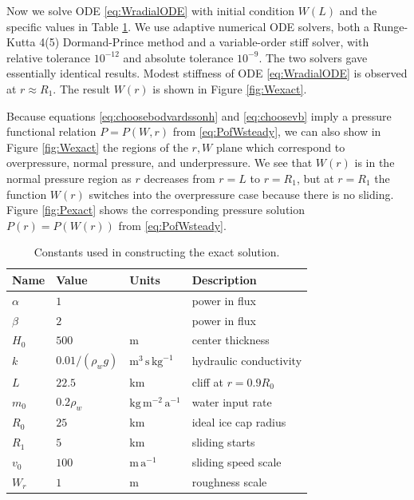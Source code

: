 \documentclass[gmd]{copernicus}   %
\newcommand{\text}{\textrm}
\begin{document}
Now we solve ODE \eqref{eq:WradialODE} with initial condition $W(L)$ and the specific values in Table \ref{tab:verifconstants}.  We use adaptive numerical ODE solvers, both a Runge-Kutta 4(5) Dormand-Prince method and a variable-order stiff solver, with relative tolerance $10^{-12}$ and absolute tolerance $10^{-9}$.  The two solvers gave essentially identical results.  Modest stiffness \citep{AscherPetzold} of ODE \eqref{eq:WradialODE} is observed at $r\approx R_1$.  The result $W(r)$ is shown in Figure \ref{fig:Wexact}.

Because equations \eqref{eq:choosebodvardssonh} and \eqref{eq:choosevb} imply a pressure functional relation $P=P(W,r)$ from \eqref{eq:PofWsteady}, we can also show in Figure \ref{fig:Wexact} the regions of the $r,W$ plane which correspond to overpressure, normal pressure, and underpressure.  We see that $W(r)$ is in the normal pressure region as $r$ decreases from $r=L$ to $r=R_1$, but at $r=R_1$ the function $W(r)$ switches into the overpressure case because there is no sliding.  Figure \ref{fig:Pexact} shows the corresponding pressure solution $P(r)=P(W(r))$ from \eqref{eq:PofWsteady}.

\begin{table}[ht]
  \centering
  \caption{Constants used in constructing the exact solution.}
  \begin{tabular}{llll}
    \textbf{Name} & \textbf{Value} & \textbf{Units} & \textbf{Description}\\
\hline
    $\alpha$ & $1$ & & power in flux \\
    $\beta$  & $2$ & & power in flux \\
    $H_0$ & $500$ & m & center thickness \\
    $k$   & $0.01/(\rho_w g)$ & $\text{m}^3\,\text{s}\,\text{kg}^{-1}$ & hydraulic conductivity \\
    $L$   & $22.5$& km & cliff at $r=0.9 R_0$ \\
    $m_0$ & $0.2\rho_w$ & $\text{kg}\,\text{m}^{-2}\,\text{a}^{-1}$ & water input rate \\
    $R_0$ & $25$  & km & ideal ice cap radius \\
    $R_1$ & $5$   & km & sliding starts \\
    $v_0$ & $100$ & $\text{m}\,\text{a}^{-1}$ & sliding speed scale \\
    $W_r$ & $1$ & m & roughness scale \\
    \hline
  \end{tabular}
 \label{tab:verifconstants}
\end{table}
\end{document}
